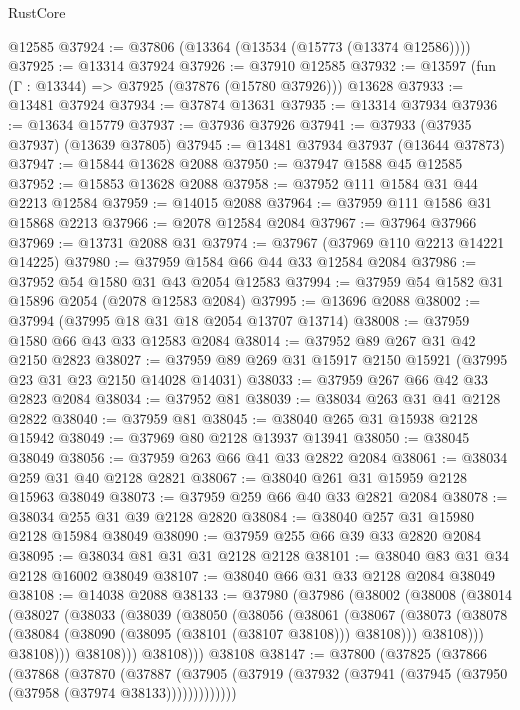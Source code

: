 \begin{lexlean}{RustCore}
\begin{coremodule}
    @12585
@37924 := @37806 (@13364 (@13534 (@15773 (@13374 @12586))))
@37925 := @13314 @37924
@37926 := @37910 @12585
@37932 := @13597 (fun (Γ : @13344) => @37925 (@37876 (@15780 @37926))) @13628
@37933 := @13481 @37924
@37934 := @37874 @13631
@37935 := @13314 @37934
@37936 := @13634 @15779
@37937 := @37936 @37926
@37941 := @37933 (@37935 @37937) (@13639 @37805)
@37945 := @13481 @37934 @37937 (@13644 @37873)
@37947 := @15844 @13628 @2088
@37950 := @37947 @1588 @45 @12585
@37952 := @15853 @13628 @2088
@37958 := @37952 @111 @1584 @31 @44 @2213 @12584
@37959 := @14015 @2088
@37964 := @37959 @111 @1586 @31 @15868 @2213
@37966 := @2078 @12584 @2084
@37967 := @37964 @37966
@37969 := @13731 @2088 @31
@37974 := @37967 (@37969 @110 @2213 @14221 @14225)
@37980 := @37959 @1584 @66 @44 @33 @12584 @2084
@37986 := @37952 @54 @1580 @31 @43 @2054 @12583
@37994 := @37959 @54 @1582 @31 @15896 @2054 (@2078 @12583 @2084)
@37995 := @13696 @2088
@38002 := @37994 (@37995 @18 @31 @18 @2054 @13707 @13714)
@38008 := @37959 @1580 @66 @43 @33 @12583 @2084
@38014 := @37952 @89 @267 @31 @42 @2150 @2823
@38027 := @37959 @89 @269 @31 @15917 @2150 @15921 (@37995 @23 @31 @23 @2150 @14028 @14031)
@38033 := @37959 @267 @66 @42 @33 @2823 @2084
@38034 := @37952 @81
@38039 := @38034 @263 @31 @41 @2128 @2822
@38040 := @37959 @81
@38045 := @38040 @265 @31 @15938 @2128 @15942
@38049 := @37969 @80 @2128 @13937 @13941
@38050 := @38045 @38049
@38056 := @37959 @263 @66 @41 @33 @2822 @2084
@38061 := @38034 @259 @31 @40 @2128 @2821
@38067 := @38040 @261 @31 @15959 @2128 @15963 @38049
@38073 := @37959 @259 @66 @40 @33 @2821 @2084
@38078 := @38034 @255 @31 @39 @2128 @2820
@38084 := @38040 @257 @31 @15980 @2128 @15984 @38049
@38090 := @37959 @255 @66 @39 @33 @2820 @2084
@38095 := @38034 @81 @31 @31 @2128 @2128
@38101 := @38040 @83 @31 @34 @2128 @16002 @38049
@38107 := @38040 @66 @31 @33 @2128 @2084 @38049
@38108 := @14038 @2088
@38133 := @37980
    (@37986
      (@38002
        (@38008
          (@38014
            (@38027
              (@38033
                (@38039
                  (@38050
                    (@38056
                      (@38061
                        (@38067
                          (@38073
                            (@38078 (@38084 (@38090 (@38095 (@38101 (@38107 @38108))) @38108)))
                            @38108)))
                      @38108)))
                @38108)))
          @38108)))
    @38108
@38147 := @37800
    (@37825
      (@37866
        (@37868
          (@37870
            (@37887
              (@37905 (@37919 (@37932 (@37941 (@37945 (@37950 (@37958 (@37974 @38133)))))))))))))

\end{coremodule}
\end{lexlean}
